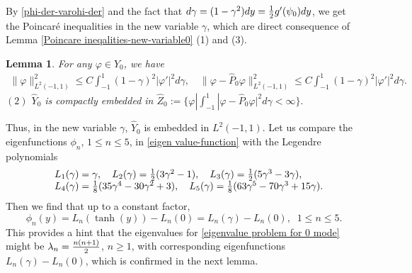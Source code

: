 \documentclass[1 [leqno, 11pt]{amsart}
\numberwithin{equation}{section}
\newtheorem{lemma}[Theorem]{Lemma}
\begin{document}
\begin{CJK*}{GBK}{song}
By \eqref{phi-der-varohi-der} and the fact that $d\gamma=(1-\gamma^2)dy={1\over2}g'(\psi_0)dy$, we get the Poincar\'e inequalities
 in the new variable $\gamma$, which are direct consequence of Lemma \ref{Poincare ineqalities-new-variable0} (1) and (3).
\begin{lemma}\label{Poincare inequalities compact embedding result  new variables}
For any $\varphi \in \hat{Y}_0$, we have
\begin{align*}
 \|\varphi\|^2_{L^2(-1,1)}   \leq C\int_{-1}^1 (1-\gamma)^2| \varphi'|^2d\gamma,\quad \|\varphi-\hat P_0\varphi\|^2_{L^2(-1,1)}   \leq C\int_{-1}^1 (1-\gamma)^2| \varphi'|^2d\gamma.
\end{align*}
$(2)$ $\hat Y_0$ is compactly embedded in $\hat Z_0 := \{ \varphi | \int_{-1}^1 |\varphi - \hat{P}_0 \varphi|^2 d \gamma < \infty \}.$
\fi
\end{lemma}
Thus, in the new variable $\gamma$, $\hat Y_0$ is embedded in $L^2(-1,1)$. Let us compare the eigenfunctions $\phi_{n}$, $1\leq n\leq 5$, in \eqref{eigen value-function} with the  Legendre polynomials
\begin{equation*}\begin{aligned}\begin{array}{llll}
&L_1(\gamma)=\gamma,
\quad L_2(\gamma)={1\over2}(3\gamma^2-1),\quad
L_3(\gamma)={1\over2}(5\gamma^3-3\gamma),\\
&L_4(\gamma)={1\over8}(35\gamma^4-30\gamma^2+3),\quad
L_5(\gamma)={1\over8}(63\gamma^5-70\gamma^3+15\gamma).
\end{array}
\end{aligned}
\end{equation*}
Then we find that up to a constant factor,
\begin{equation*}
\phi_{n}(y)=L_{n}(\tanh(y))-L_{n}(0)=L_{n}(\gamma)-L_{n}(0), \;\;1\leq n\leq 5.
\end{equation*}
This provides a hint that
 the eigenvalues  for  \eqref{eigenvalue problem for 0 mode} might be $\lambda_n={n(n+1)\over2}$, $n\geq1$, with corresponding eigenfunctions $L_{n}(\gamma)-L_{n}(0)$, which is confirmed in the next lemma.


\end{CJK*}
\end{document}
